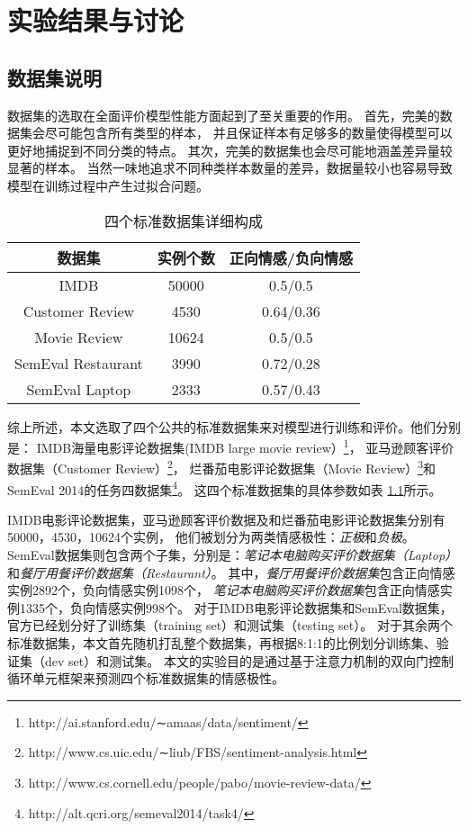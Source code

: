 
\chapter{实验结果与讨论}
\label{chapter-basic}

\section{数据集说明}
数据集的选取在全面评价模型性能方面起到了至关重要的作用。
首先，完美的数据集会尽可能包含所有类型的样本，
并且保证样本有足够多的数量使得模型可以更好地捕捉到不同分类的特点。
其次，完美的数据集也会尽可能地涵盖差异量较显著的样本。
当然一味地追求不同种类样本数量的差异，数据量较小也容易导致模型在训练过程中产生过拟合问题。

\begin{table}[h!]
    \centering
    \caption{四个标准数据集详细构成}
    \label{Table:datasets}
    \begin{tabular}{@{}ccc@{}}
    \hline
    数据集                & 实例个数  & 正向情感/负向情感 \\ \hline
    IMDB               & 50000 & 0.5/0.5   \\
    Customer Review    & 4530  & 0.64/0.36 \\
    Movie Review       & 10624 & 0.5/0.5   \\
    SemEval Restaurant & 3990  & 0.72/0.28 \\
    SemEval Laptop     & 2333  & 0.57/0.43 \\ \hline
    \end{tabular}
    \end{table}

综上所述，本文选取了四个公共的标准数据集来对模型进行训练和评价。他们分别是：
IMDB海量电影评论数据集(IMDB large movie review）\footnote{http://ai.stanford.edu/∼amaas/data/sentiment/}，
亚马逊顾客评价数据集（Customer Review）\footnote{http://www.cs.uic.edu/∼liub/FBS/sentiment-analysis.html}，
烂番茄电影评论数据集（Movie Review）\footnote{http://www.cs.cornell.edu/people/pabo/movie-review-data/}和
SemEval 2014的任务四数据集\footnote{http://alt.qcri.org/semeval2014/task4/}。
这四个标准数据集的具体参数如表 \ref{Table:datasets}所示。

IMDB电影评论数据集，亚马逊顾客评价数据及和烂番茄电影评论数据集分别有50000，4530，10624个实例，
他们被划分为两类情感极性：\emph{正极}和\emph{负极}。
SemEval数据集则包含两个子集，分别是：\emph{笔记本电脑购买评价数据集（Laptop）}和\emph{餐厅用餐评价数据集（Restaurant）}。
其中，\emph{餐厅用餐评价数据集}包含正向情感实例2892个，负向情感实例1098个，
\emph{笔记本电脑购买评价数据集}包含正向情感实例1335个，负向情感实例998个。
对于IMDB电影评论数据集和SemEval数据集，官方已经划分好了训练集（training set）和测试集（testing set）。
对于其余两个标准数据集，本文首先随机打乱整个数据集，再根据8:1:1的比例划分训练集、验证集（dev set）和测试集。
本文的实验目的是通过基于注意力机制的双向门控制循环单元框架来预测四个标准数据集的情感极性。

